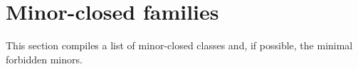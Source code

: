 \section{Minor-closed families}\label{sec:minor_closed_families}

This section compiles a list of minor-closed classes and, if possible, the minimal forbidden minors.